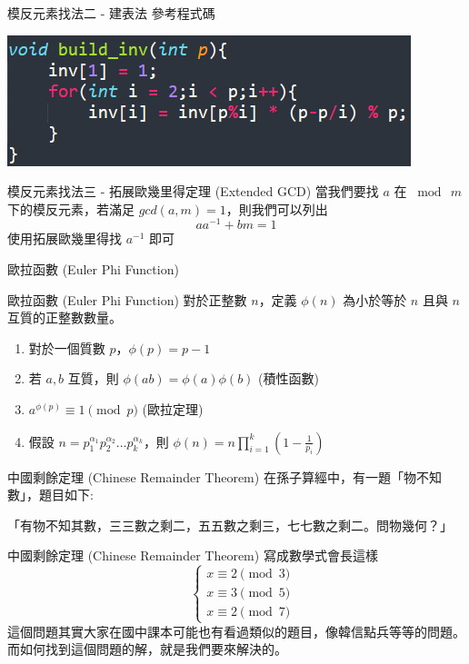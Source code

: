 \documentclass[aspectratio=169]{beamer}
\begin{document}
\begin{frame}{模反元素找法二 - 建表法}
    參考程式碼
    \begin{center}
        \includegraphics[]{images/code9.png}
    \end{center}
\end{frame}

\begin{frame}{模反元素找法三 - 拓展歐幾里得定理 (Extended GCD)}
    當我們要找 $a$ 在 $\bmod \ m$ 下的模反元素，若滿足 $gcd(a,m)=1$，則我們可以列出
    $$aa^{-1} + bm = 1$$
    使用拓展歐幾里得找 $a^{-1}$ 即可
\end{frame}

\begin{frame}{歐拉函數 (Euler Phi Function)}
    \begin{alertblock}{歐拉函數 (Euler Phi Function)}
        對於正整數 $n$，定義 $\phi(n)$ 為小於等於 $n$ 且與 $n$ 互質的正整數數量。
        \begin{enumerate}
            \item 對於一個質數 $p$，$\phi(p) = p-1$
            \item 若 $a,b$ 互質，則 $\phi(ab) = \phi(a) \phi(b)$ (積性函數)
            \item $a^{\phi(p)} \equiv 1 \pmod p$ (歐拉定理)
            \item 假設 $n=p_1^{\alpha_1}p_2^{\alpha_2}\dots p_k^{\alpha_k}$，則 $\phi(n) = n \prod_{i=1}^k (1-\frac{1}{p_i})$
        \end{enumerate}
    \end{alertblock}
\end{frame}

\begin{frame}{中國剩餘定理 (Chinese Remainder Theorem)}
    在孫子算經中，有一題「物不知數」，題目如下:
    \begin{center}
        「有物不知其數，三三數之剩二，五五數之剩三，七七數之剩二。問物幾何？」
    \end{center}
\end{frame}

\begin{frame}{中國剩餘定理 (Chinese Remainder Theorem)}
    寫成數學式會長這樣
    \begin{equation*}
        \quad \left\{ \begin{matrix} x \equiv 2 \pmod {3} \\ x \equiv 3 \pmod {5} \\ x \equiv 2 \pmod {7} \end{matrix} \right.
    \end{equation*} \pause
    這個問題其實大家在國中課本可能也有看過類似的題目，像韓信點兵等等的問題。 \\
    而如何找到這個問題的解，就是我們要來解決的。
\end{frame}
\end{document}
